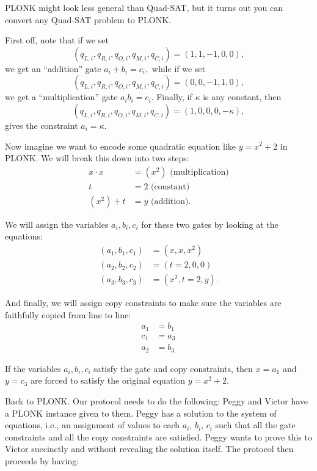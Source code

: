 \begin{remark}
PLONK might look less general than Quad-SAT,
but it turns out you can convert any Quad-SAT problem to PLONK.

First off, note that if we set
\[\left( q_{L,i},q_{R,i},q_{O,i},q_{M,i},q_{C,i} \right) = (1,1, - 1,0,0),\]
we get an ``addition'' gate \(a_{i} + b_{i} = c_{i},\) while if we set
\[\left( q_{L,i},q_{R,i},q_{O,i},q_{M,i},q_{C,i} \right) = (0,0, - 1,1,0),\]
we get a ``multiplication'' gate \(a_{i}b_{i} = c_{i}.\) Finally, if
\(\kappa\) is any constant, then
\[\left( q_{L,i},q_{R,i},q_{O,i},q_{M,i},q_{C,i} \right) = (1,0,0,0, - \kappa),\]
gives the constraint \(a_{i} = \kappa.\)

Now imagine we want to encode some quadratic equation like
\(y = x^{2} + 2\) in PLONK. We will break this down into two steps:
\[\begin{aligned}
x \cdot x & = \left( x^{2} \right)\text{ (multiplication)} \\
t & = 2\text{ (constant)} \\
\left( x^{2} \right) + t & = y\text{ (addition)}.
\end{aligned}\]

We will assign the variables \(a_{i},b_{i},c_{i}\) for these two gates
by looking at the equations: \[\begin{aligned}
\left( a_{1},b_{1},c_{1} \right) & = \left( x,x,x^{2} \right) \\
\left( a_{2},b_{2},c_{2} \right) & = (t = 2,0,0) \\
\left( a_{3},b_{3},c_{3} \right) & = \left( x^{2},t = 2,y \right).
\end{aligned}\]

And finally, we will assign copy constraints to make sure the variables
are faithfully copied from line to line: \[\begin{aligned}
a_{1} & = b_{1} \\
c_{1} & = a_{3} \\
a_{2} & = b_{3.}
\end{aligned}\]

If the variables \(a_{i},b_{i},c_{i}\) satisfy the gate and copy
constraints, then \(x = a_{1}\) and \(y = c_{3}\) are forced to satisfy
the original equation \(y = x^{2} + 2\).
\end{remark}

Back to PLONK. Our protocol needs to do the following: Peggy and Victor
have a PLONK instance given to them. Peggy has a solution to the system
of equations, i.e., an assignment of values to each \(a_{i}\),
\(b_{i}\), \(c_{i}\) such that all the gate constraints and all the copy
constraints are satisfied. Peggy wants to prove this to Victor
succinctly and without revealing the solution itself. The protocol then
proceeds by having:

